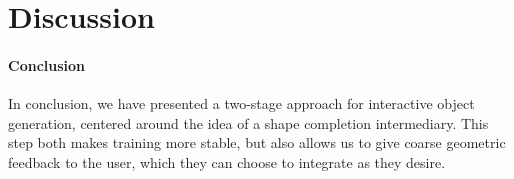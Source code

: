 
\section{Discussion}


\paragraph{Conclusion}
In conclusion, we have presented a two-stage approach for interactive object generation, centered around the idea of a shape completion intermediary. 
This step both makes training more stable, but also allows us to give coarse geometric feedback to the user, which they can choose to integrate as they desire. 





